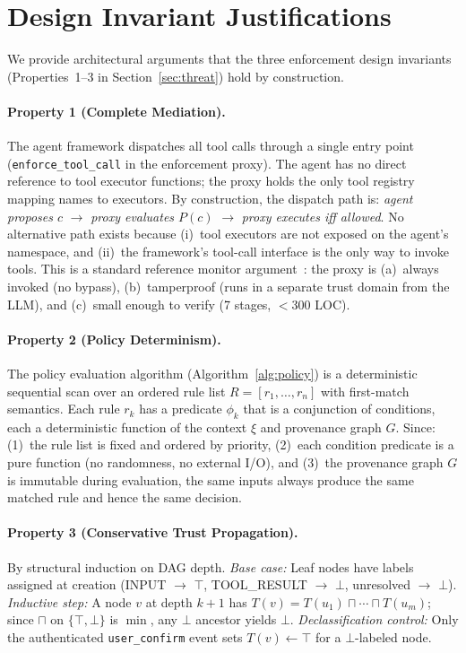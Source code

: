 \section{Design Invariant Justifications}
\label{sec:appendix-proofs}

We provide architectural arguments that the three enforcement design invariants (Properties~1--3 in Section~\ref{sec:threat}) hold by construction.

\paragraph{Property 1 (Complete Mediation).}
The agent framework dispatches all tool calls through a single entry point (\texttt{enforce\_tool\_call} in the enforcement proxy). The agent has no direct reference to tool executor functions; the proxy holds the only tool registry mapping names to executors. By construction, the dispatch path is: \emph{agent proposes $c$} $\to$ \emph{proxy evaluates $P(c)$} $\to$ \emph{proxy executes iff allowed}. No alternative path exists because (i)~tool executors are not exposed on the agent's namespace, and (ii)~the framework's tool-call interface is the only way to invoke tools. This is a standard reference monitor argument~\cite{anderson1972reference}: the proxy is (a)~always invoked (no bypass), (b)~tamperproof (runs in a separate trust domain from the LLM), and (c)~small enough to verify (7 stages, $<$300 LOC).

\paragraph{Property 2 (Policy Determinism).}
The policy evaluation algorithm (Algorithm~\ref{alg:policy}) is a deterministic sequential scan over an ordered rule list $R = [r_1, \ldots, r_n]$ with first-match semantics. Each rule $r_k$ has a predicate $\phi_k$ that is a conjunction of conditions, each a deterministic function of the context $\xi$ and provenance graph $G$. Since: (1)~the rule list is fixed and ordered by priority, (2)~each condition predicate is a pure function (no randomness, no external I/O), and (3)~the provenance graph $G$ is immutable during evaluation, the same inputs always produce the same matched rule and hence the same decision.

\paragraph{Property 3 (Conservative Trust Propagation).}
By structural induction on DAG depth. \emph{Base case:} Leaf nodes have labels assigned at creation (INPUT $\to$ $\top$, TOOL\_RESULT $\to$ $\bot$, unresolved $\to$ $\bot$). \emph{Inductive step:} A node $v$ at depth $k{+}1$ has $T(v) = T(u_1) \sqcap \cdots \sqcap T(u_m)$; since $\sqcap$ on $\{\top, \bot\}$ is $\min$, any $\bot$ ancestor yields $\bot$. \emph{Declassification control:} Only the authenticated \texttt{user\_confirm} event sets $T(v) \leftarrow \top$ for a $\bot$-labeled node.


